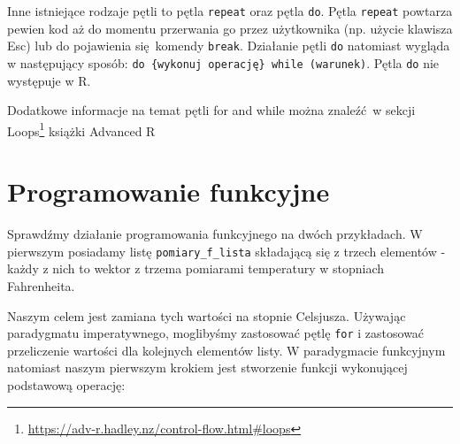 \documentclass[paper=6in:9in,pagesize=pdftex,headinclude=on,footinclude=on,10pt]{scrbook}
\newenvironment{Shaded}{\begin{snugshade}}{\end{snugshade}}
\newcommand{\CommentTok}[1]{\textcolor[rgb]{0.56,0.35,0.01}{\textit{#1}}}
\newcommand{\DataTypeTok}[1]{\textcolor[rgb]{0.13,0.29,0.53}{#1}}
\newcommand{\DecValTok}[1]{\textcolor[rgb]{0.00,0.00,0.81}{#1}}
\newcommand{\KeywordTok}[1]{\textcolor[rgb]{0.13,0.29,0.53}{\textbf{#1}}}
\newcommand{\NormalTok}[1]{#1}
\newcommand{\StringTok}[1]{\textcolor[rgb]{0.31,0.60,0.02}{#1}}
\DeclareRobustCommand{\href}[2]{#2\footnote{\url{#1}}}
\let\BeginKnitrBlock\begin \let\EndKnitrBlock\end
\begin{document}
\BeginKnitrBlock{rmdinfo}
Inne istniejące rodzaje pętli to pętla \texttt{repeat} oraz pętla \texttt{do}.
Pętla \texttt{repeat} powtarza pewien kod aż do momentu przerwania go przez użytkownika (np. użycie klawisza Esc) lub do pojawienia się~komendy \texttt{break}.
Działanie pętli \texttt{do} natomiast wygląda w następujący sposób:
\texttt{do\ \{wykonuj\ operację\}\ while\ (warunek)}.
Pętla \texttt{do} nie występuje w R.
\EndKnitrBlock{rmdinfo}

Dodatkowe informacje na temat pętli for and while można znaleźć~w sekcji \href{https://adv-r.hadley.nz/control-flow.html\#loops}{Loops} książki Advanced R \citep{wickham2014advanced}

\hypertarget{prog-fun}{%
\section{Programowanie funkcyjne}\label{prog-fun}}

Sprawdźmy działanie programowania funkcyjnego na dwóch przykładach.
W pierwszym posiadamy listę \texttt{pomiary\_f\_lista} składającą się z trzech elementów - każdy z nich to wektor z trzema pomiarami temperatury w stopniach Fahrenheita.

\begin{Shaded}
\end{Shaded}

Naszym celem jest zamiana tych wartości na stopnie Celsjusza.
Używając paradygmatu imperatywnego, moglibyśmy zastosować pętlę \texttt{for} i zastosować przeliczenie wartości dla kolejnych elementów listy.
W paradygmacie funkcyjnym natomiast naszym pierwszym krokiem jest stworzenie funkcji wykonującej podstawową operację:
\end{document}
